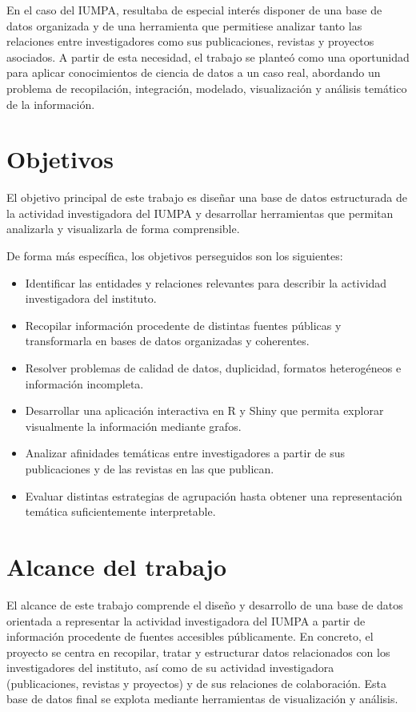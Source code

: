 \documentclass[11pt,spanish,listoffigures,listoftables]{tfgetsinf}
\begin{document}
En el caso del IUMPA, resultaba de especial interés disponer de una base de datos organizada y de una herramienta que permitiese analizar tanto las relaciones entre investigadores como sus publicaciones, revistas y proyectos asociados. A partir de esta necesidad, el trabajo se planteó como una oportunidad para aplicar conocimientos de ciencia de datos a un caso real, abordando un problema de recopilación, integración, modelado, visualización y análisis temático de la información.

\section{Objetivos}

El objetivo principal de este trabajo es diseñar una base de datos estructurada de la actividad investigadora del IUMPA y desarrollar herramientas que permitan analizarla y visualizarla de forma comprensible.

De forma más específica, los objetivos perseguidos son los siguientes:

\begin{itemize}
    \item Identificar las entidades y relaciones relevantes para describir la actividad investigadora del instituto.
    \item Recopilar información procedente de distintas fuentes públicas y transformarla en bases de datos organizadas y coherentes.
    \item Resolver problemas de calidad de datos, duplicidad, formatos heterogéneos e información incompleta.
    \item Desarrollar una aplicación interactiva en R y Shiny que permita explorar visualmente la información mediante grafos.
    \item Analizar afinidades temáticas entre investigadores a partir de sus publicaciones y de las revistas en las que publican.
    \item Evaluar distintas estrategias de agrupación hasta obtener una representación temática suficientemente interpretable.
\end{itemize}

\section{Alcance del trabajo}

El alcance de este trabajo comprende el diseño y desarrollo de una base de datos orientada a representar la actividad investigadora del IUMPA a partir de información procedente de fuentes accesibles públicamente. En concreto, el proyecto se centra en recopilar, tratar y estructurar datos relacionados con los investigadores del instituto, así como de su actividad investigadora (publicaciones, revistas y proyectos) y de sus relaciones de colaboración. Esta base de datos final se explota mediante herramientas de visualización y análisis.
\end{document}
